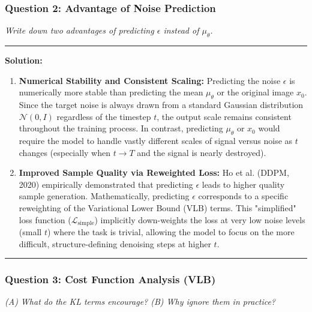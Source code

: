 \documentclass[a4paper,12pt]{article}
\newenvironment{solutionbox}{
    \par
    \vspace{0.5em}
    \noindent
    {\color{primary}\rule{\linewidth}{0.4pt}}
    \par\smallskip
    \noindent\textbf{\color{primary}Solution:}
    \par\smallskip
    \small
}{
    \par\smallskip
    {\color{primary}\rule{\linewidth}{0.4pt}}
    \par\vspace{0.5em}
}
\begin{document}
\subsubsection{Question 2: Advantage of Noise Prediction}
\textit{Write down two advantages of predicting $\epsilon$ instead of $\mu_\theta$.}

\begin{solutionbox}
    \begin{enumerate}
        \item \textbf{Numerical Stability and Consistent Scaling:} 
        Predicting the noise $\epsilon$ is numerically more stable than predicting the mean $\mu_\theta$ or the original image $x_0$. Since the target noise is always drawn from a standard Gaussian distribution $\mathcal{N}(0, I)$ regardless of the timestep $t$, the output scale remains consistent throughout the training process. In contrast, predicting $\mu_\theta$ or $x_0$ would require the model to handle vastly different scales of signal versus noise as $t$ changes (especially when $t \to T$ and the signal is nearly destroyed).
        
        \item \textbf{Improved Sample Quality via Reweighted Loss:}
        Ho et al. (DDPM, 2020) empirically demonstrated that predicting $\epsilon$ leads to higher quality sample generation. Mathematically, predicting $\epsilon$ corresponds to a specific reweighting of the Variational Lower Bound (VLB) terms. This "simplified" loss function ($\mathcal{L}_{\text{simple}}$) implicitly down-weights the loss at very low noise levels (small $t$) where the task is trivial, allowing the model to focus on the more difficult, structure-defining denoising steps at higher $t$.
    \end{enumerate}
\end{solutionbox}

\subsubsection{Question 3: Cost Function Analysis (VLB)}
\textit{(A) What do the KL terms encourage? (B) Why ignore them in practice?}
\end{document}
